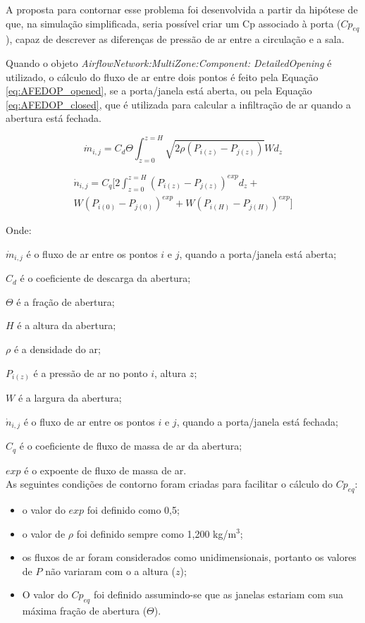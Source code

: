 \documentclass[brazil,hardcopy,openany,a5paper]{ufscthesis}
\begin{document}
		A proposta para contornar esse problema foi desenvolvida a partir da hipótese de que, na simulação simplificada, seria possível criar um Cp associado à porta ($Cp_{eq}$), capaz de descrever as diferenças de pressão de ar entre a circulação e a sala.  %
		
		Quando o objeto \textit{AirflowNetwork:MultiZone:Component: DetailedOpening} é utilizado, o cálculo do fluxo de ar entre dois pontos é feito pela Equação \ref{eq:AFEDOP_opened}, se a porta/janela está aberta, ou pela Equação \ref{eq:AFEDOP_closed}, que é utilizada para calcular a infiltração de ar quando a abertura está fechada.
		
		\begin{equation}
		\label{eq:AFEDOP_opened}
		\dot{m}_{i,j} = C_d \Theta 	\int_{z=0}^{z=H} \sqrt{2 \rho (P_{i(z)} - P_{j(z)})} W d_z 
		\end{equation}
		
		\begin{equation}
		\label{eq:AFEDOP_closed}
		\begin{split}
		\dot{n}_{i,j} = C_q [2\int_{z=0}^{z=H} {(P_{i(z)} - P_{j(z)})}^{exp} d_z + \\ W{(P_{i(0)} - P_{j(0)})}^{exp} + W{(P_{i(H)} - P_{j(H)})}^{exp}]
		\end{split}
		\end{equation}
		
		Onde:
		
		$\dot{m}_{i,j}$ é o fluxo de ar entre os pontos $i$ e $j$, quando a porta/janela está aberta;
		
		$C_d$ é o coeficiente de descarga da abertura;
		
		$\Theta$ é a fração de abertura;
		
		$H$ é a altura da abertura;
		
		$\rho$ é a densidade do ar;
		
		$P_{i(z)}$ é a pressão de ar no ponto $i$, altura $z$;
		
		$W$ é a largura da abertura;
		
		$\dot{n}_{i,j}$ é o fluxo de ar entre os pontos $i$ e $j$, quando a porta/janela está fechada;
		
		$C_q$ é o coeficiente de fluxo de massa de ar da abertura;
		
		$exp$ é o expoente de fluxo de massa de ar.
		\\
		
		As seguintes condições de contorno foram criadas para facilitar o cálculo do $Cp_{eq}$:
		\begin{itemize}			 
			\item o valor do $exp$ foi definido como 0,5;
			\item o valor de $\rho$ foi definido sempre como 1,200 kg/m$^3$;
			\item os fluxos de ar foram considerados como unidimensionais, portanto os valores de $P$ não variaram com o a altura ($z$);
			\item O valor do $Cp_{eq}$ foi definido assumindo-se que as janelas estariam com sua máxima fração de abertura ($\Theta$).
		\end{itemize}
		
\end{document}
